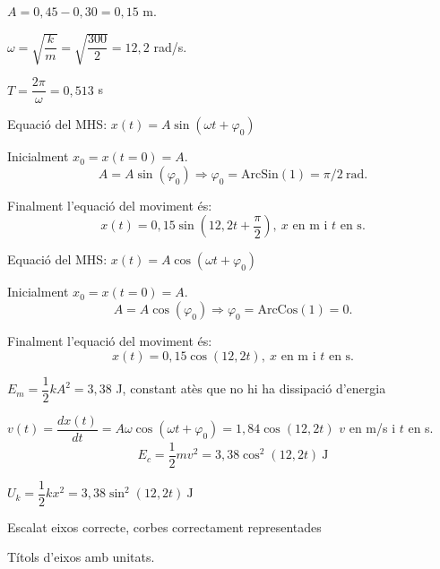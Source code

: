 \begin{solapartat}
 $A = 0,45-0,30=0,15$ m.

 $\omega = \sqrt{\dfrac{k}{m}} = \sqrt{\dfrac{300}{2}} = 12,2$ rad/s.

 $T = \dfrac{2\pi}{\omega} = 0,513$ s


 Equació del MHS: $x(t) = A\sin(\omega t + \varphi_0)$

 Inicialment $x_0 = x(t=0) = A$.
\[ A = A\sin(\varphi_0) \Rightarrow \varphi_0 = \mathrm{ArcSin}(1) = \pi/2\ \mathrm{rad}. \]

 Finalment l'equació del moviment és:
\[ x(t) = 0,15\sin\left(12,2t + \frac{\pi}{2}\right),\ x \text{ en m i } t \text{ en s.} \]


 Equació del MHS: $x(t) = A\cos(\omega t + \varphi_0)$

 Inicialment $x_0 = x(t=0) = A$.
\[ A = A\cos(\varphi_0) \Rightarrow \varphi_0 = \mathrm{ArcCos}(1) = 0. \]

 Finalment l'equació del moviment és:
\[ x(t) = 0,15\cos(12,2t),\ x \text{ en m i } t \text{ en s.} \]
\end{solapartat}

\begin{solapartat}
 $E_m = \dfrac{1}{2}kA^2 = 3,38$ J, constant atès que no hi ha dissipació
d'energia

 $v(t) = \dfrac{dx(t)}{dt} = A\omega\cos(\omega t + \varphi_0) = 1,84\cos(12,2t)$
$v$ en m/s i $t$ en s.
\[ E_c = \frac{1}{2}mv^2 = 3,38\cos^2(12,2t)\ \mathrm{J} \]

 $U_k = \dfrac{1}{2}kx^2 = 3,38\sin^2(12,2t)\ \mathrm{J}$


 Escalat eixos correcte, corbes correctament representades

 Títols d'eixos amb unitats.
\end{solapartat}
